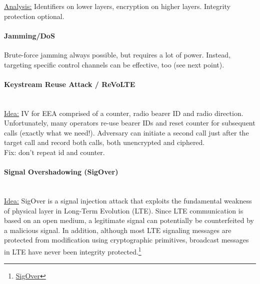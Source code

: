 \underline{Analysis:}
Identifiers on lower layers, encryption on higher layers.
Integrity protection optional.

\paragraph{Jamming/DoS}
Brute-force jamming always possible, but requires a lot of power. Instead,
targeting specific control channels can be effective, too (see next point).




\paragraph{Keystream Reuse Attack / ReVoLTE} \mbox{} \\
\underline{Idea:} IV for EEA comprised of a counter, radio bearer ID and radio direction.
\\
Unfortunately, many operators re-use bearer IDs and reset counter for subsequent calls (exactly what we need!).
Adversary can initiate a second call just after the target call and record both calls, both unencrypted and ciphered.
\\
Fix: don't repeat id and counter.

\paragraph{Signal Overshadowing (SigOver)} \mbox{} \\
\underline{Idea:}
SigOver is a signal injection attack that exploits the fundamental weakness of physical layer in Long-Term Evolution (LTE). Since LTE communication is based on an open medium, a legitimate signal can potentially be counterfeited by a malicious signal. In addition, although most LTE signaling messages are protected from modification using cryptographic primitives, broadcast messages in LTE have never been integrity protected.\footnote{\href{https://github.com/SysSec-KAIST/sigover_injector}{SigOver}}

